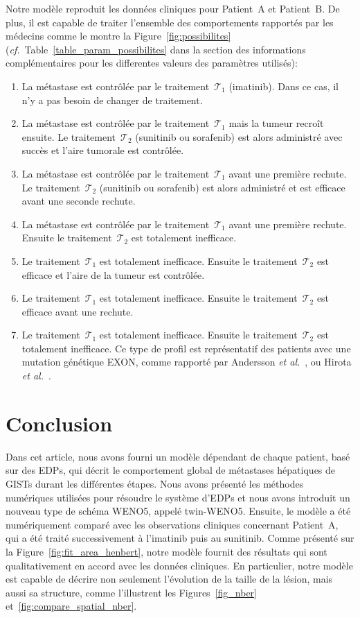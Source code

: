 \documentclass[11pt]{amsart}
\numberwithin{equation}{section}
\newcommand{\TI}{{\mathcal T_1}}
\newcommand{\TS}{{\mathcal T_2}}
\newcommand{\twinweno}{twin-WENO5}
\newcommand{\cf}{\textit{cf.}~}
\newcommand{\Nber}{Patient~A\xspace}
\newcommand{\Chen}{Patient~B\xspace}
\begin{document}
Notre modèle reproduit les données cliniques pour \Nber et \Chen. De plus, il est capable de traiter l'ensemble des comportements rapportés par les médecins comme le montre la Figure~\ref{fig:possibilites} 
(\cf Table~\ref{table_param_possibilites} dans la section des informations complémentaires pour les differentes valeurs des paramètres utilisés):
\begin{enumerate}[label={\alph{*})}]
\item La métastase est contrôlée par le traitement~$\TI$ (imatinib). 
Dans ce cas, il n'y a pas besoin de changer de traitement. 
\item La métastase est contrôlée par le traitement~$\TI$ mais la tumeur recroît ensuite. Le traitement~$\TS$ (sunitinib ou sorafenib) est alors administré avec succès et l'aire tumorale est contrôlée. 
\item La métastase est contrôlée par le traitement~$\TI$ avant une première rechute. Le traitement~$\TS$ (sunitinib ou sorafenib) est alors administré et est efficace avant une seconde rechute. 
\item La métastase est contrôlée par le traitement~$\TI$ avant une première rechute. Ensuite le traitement~$\TS$ est totalement inefficace. 
\item Le traitement~$\TI$ est totalement inefficace. 
Ensuite le traitement~$\TS$ est efficace et l'aire de la tumeur est contrôlée. 
\item Le traitement~$\TI$ est totalement inefficace. 
Ensuite le traitement~$\TS$ est efficace avant une rechute.
\item Le traitement~$\TI$ est totalement inefficace. 
Ensuite le  traitement~$\TS$ est totalement inefficace. 
Ce type de profil est représentatif des patients avec une mutation génétique EXON, comme rapporté par Andersson
{\it et al.}~\cite{Andersson2006}, ou Hirota {\it et al.}~\cite{Hirota1998}.
\end{enumerate}



\FloatBarrier
\section{Conclusion}

Dans cet article, nous avons fourni un modèle dépendant de chaque patient, basé sur des EDPs, qui décrit le comportement global de métastases hépatiques de GISTs durant les différentes étapes. Nous avons présenté les méthodes numériques utilisées pour résoudre le système d'EDPs et nous avons introduit un nouveau type de schéma WENO5, appelé \twinweno. 
Ensuite, le modèle a été numériquement comparé avec les observations cliniques concernant \Nber, qui a été traité successivement à l'imatinib puis au sunitinib.
Comme présenté sur la 
Figure~\ref{fig:fit_area_henbert}, notre modèle fournit des résultats qui sont qualitativement en accord avec les données cliniques. En particulier, notre modèle est capable de décrire non seulement l'évolution de la taille de la lésion, mais aussi sa structure, comme l'illustrent les Figures~\ref{fig_nber} et~\ref{fig:compare_spatial_nber}.
\end{document}
